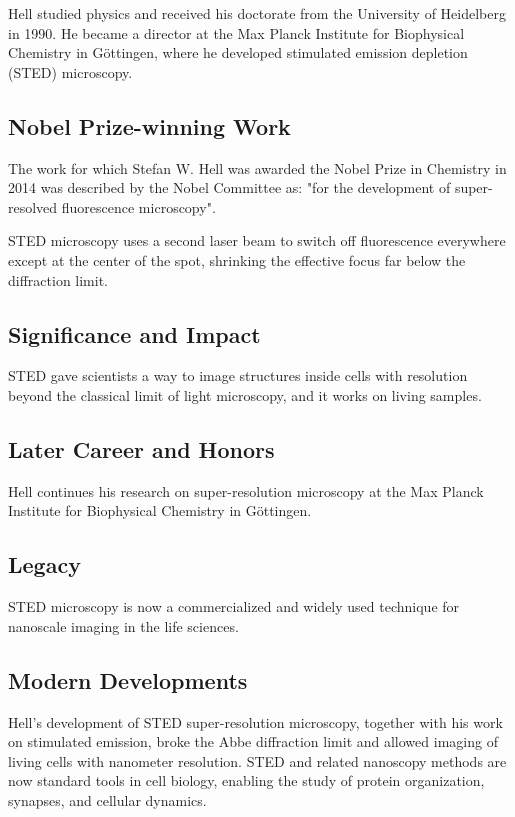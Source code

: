 Hell studied physics and received his doctorate from the University of Heidelberg in 1990. He became a director at the Max Planck Institute for Biophysical Chemistry in Göttingen, where he developed stimulated emission depletion (STED) microscopy.

\subsection*{Nobel Prize-winning Work}

The work for which Stefan W. Hell was awarded the Nobel Prize in Chemistry in 2014 was described by the Nobel Committee as: "for the development of super-resolved fluorescence microscopy".

STED microscopy uses a second laser beam to switch off fluorescence everywhere except at the center of the spot, shrinking the effective focus far below the diffraction limit.

\subsection*{Significance and Impact}

STED gave scientists a way to image structures inside cells with resolution beyond the classical limit of light microscopy, and it works on living samples.

\subsection*{Later Career and Honors}

Hell continues his research on super-resolution microscopy at the Max Planck Institute for Biophysical Chemistry in Göttingen.

\subsection*{Legacy}

STED microscopy is now a commercialized and widely used technique for nanoscale imaging in the life sciences.

\subsection*{Modern Developments}

Hell's development of STED super-resolution microscopy, together with his work on stimulated emission, broke the Abbe diffraction limit and allowed imaging of living cells with nanometer resolution. STED and related nanoscopy methods are now standard tools in cell biology, enabling the study of protein organization, synapses, and cellular dynamics.

